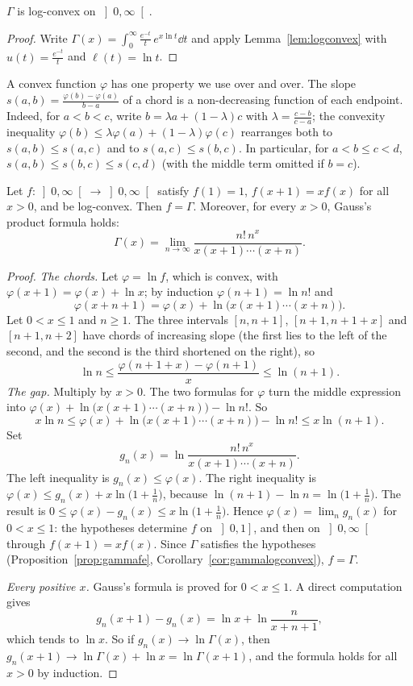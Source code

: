 \begin{corollary}\label{cor:gammalogconvex}
$\Gamma$ is log-convex on $\left]0,\infty\right[$.
\end{corollary}
\begin{proof}
Write $\Gamma(x)=\int_0^\infty\frac{e^{-t}}t\,e^{x\ln t}\dd t$ and apply Lemma~\ref{lem:logconvex} with $u(t)=\frac{e^{-t}}t$ and $\ell(t)=\ln t$.
\end{proof}

A convex function $\varphi$ has one property we use over and over. The slope $s(a,b)=\frac{\varphi(b)-\varphi(a)}{b-a}$ of a chord is a non-decreasing
function of each endpoint. Indeed, for $a<b<c$, write $b=\lambda a+(1-\lambda)c$ with $\lambda=\frac{c-b}{c-a}$; the convexity inequality
$\varphi(b)\le\lambda\varphi(a)+(1-\lambda)\varphi(c)$ rearranges both to $s(a,b)\le s(a,c)$ and to $s(a,c)\le s(b,c)$. In particular, for
$a<b\le c<d$, $s(a,b)\le s(b,c)\le s(c,d)$ (with the middle term omitted if $b=c$).

\begin{theorem}\label{thm:bohrmollerup}
Let $f:\left]0,\infty\right[\to\left]0,\infty\right[$ satisfy $f(1)=1$, $f(x+1)=xf(x)$ for all $x>0$, and be log-convex. Then $f=\Gamma$.
Moreover, for every $x>0$, Gauss's product formula holds:
\[
\Gamma(x)=\lim_{n\to\infty}\frac{n!\,n^x}{x(x+1)\cdots(x+n)}.
\]
\end{theorem}
\begin{proof}
\emph{The chords.}
Let $\varphi=\ln f$, which is convex, with $\varphi(x+1)=\varphi(x)+\ln x$; by induction $\varphi(n+1)=\ln n!$ and
\[
\varphi(x+n+1)=\varphi(x)+\ln\bigl(x(x+1)\cdots(x+n)\bigr).
\]
Let $0<x\le1$ and $n\ge1$. The three intervals $[n,n+1]$, $[n+1,n+1+x]$ and $[n+1,n+2]$ have chords of increasing slope
(the first lies to the left of the second, and the second is the third shortened on the right), so
\[
\ln n\le\frac{\varphi(n+1+x)-\varphi(n+1)}x\le\ln(n+1).
\]
\emph{The gap.}
Multiply by $x>0$. The two formulas for $\varphi$ turn the middle expression into $\varphi(x)+\ln\bigl(x(x+1)\cdots(x+n)\bigr)-\ln n!$. So
\[
x\ln n\le\varphi(x)+\ln\bigl(x(x+1)\cdots(x+n)\bigr)-\ln n!\le x\ln(n+1).
\]
Set
\[
g_n(x)=\ln\frac{n!\,n^x}{x(x+1)\cdots(x+n)}.
\]
The left inequality is $g_n(x)\le\varphi(x)$. The right inequality is $\varphi(x)\le g_n(x)+x\ln\bigl(1+\frac1n\bigr)$, because $\ln(n+1)-\ln n=\ln\bigl(1+\frac1n\bigr)$. The result is $0\le\varphi(x)-g_n(x)\le x\ln\bigl(1+\frac1n\bigr)$. Hence $\varphi(x)=\lim_ng_n(x)$ for $0<x\le1$: the hypotheses determine $f$
on $\left]0,1\right]$, and then on $\left]0,\infty\right[$ through $f(x+1)=xf(x)$. Since $\Gamma$ satisfies the hypotheses
(Proposition~\ref{prop:gammafe}, Corollary~\ref{cor:gammalogconvex}), $f=\Gamma$.

\emph{Every positive $x$.}
Gauss's formula is proved for $0<x\le1$. A direct computation gives
\[
g_n(x+1)-g_n(x)=\ln x+\ln\frac n{x+n+1},
\]
which tends to $\ln x$. So if $g_n(x)\to\ln\Gamma(x)$, then $g_n(x+1)\to\ln\Gamma(x)+\ln x=\ln\Gamma(x+1)$, and the formula holds for all $x>0$ by induction.
\end{proof}


